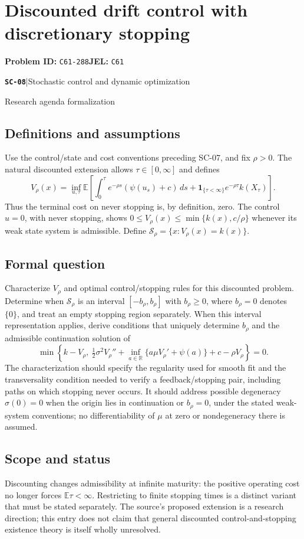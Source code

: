\documentclass[11pt,a4paper]{article}
\newcommand{\R}{\mathbb R}
\newcommand{\E}{\mathbb E}
\newcommand{\ind}{\mathbf 1}
\newcommand{\entrymeta}[3]{{\sffamily\small\color{muted}\textbf{\texttt{#1}}\quad|\quad #2\par #3\par}}
\begin{document}
\section*{Discounted drift control with discretionary stopping}
\textbf{Problem ID:} \texttt{C61-288}\quad \textbf{JEL:} \texttt{C61}\par
\label{problem:OP-0569}
\label{beyond:SC-08}
\entrymeta{SC-08}{Stochastic control and dynamic optimization}{Research agenda formalization}
\subsection*{Definitions and assumptions}
Use the control/state and cost conventions preceding SC-07, and fix
$\rho>0$. The natural discounted extension allows $\tau\in[0,\infty]$
and defines
\[
 V_\rho(x)=\inf_{u,\tau}
 \E\left[\int_0^\tau e^{-\rho s}(\psi(u_s)+c)\,ds
 +\ind_{\{\tau<\infty\}}e^{-\rho\tau}k(X_\tau)\right].
\]
Thus the terminal cost on never stopping is, by definition, zero.
The control $u=0$, with never stopping, shows
$0\leq V_\rho(x)\leq\min\{k(x),c/\rho\}$ whenever its weak state
system is admissible. Define $\mathcal S_\rho=\{x:V_\rho(x)=k(x)\}$.
\subsection*{Formal question}
Characterize $V_\rho$ and optimal control/stopping rules for this
discounted problem. Determine when $\mathcal S_\rho$ is an interval
$[-b_\rho,b_\rho]$ with $b_\rho\geq0$, where $b_\rho=0$ denotes
$\{0\}$, and treat an empty stopping region separately. When this
interval representation applies, derive conditions that uniquely determine
$b_\rho$ and the admissible continuation solution of
\[
 \min\left\{k-V_\rho,\ \tfrac12\sigma^2V_\rho''+
 \inf_{a\in\R}\{a\mu V_\rho'+\psi(a)\}+c-\rho V_\rho\right\}=0.
\]
The characterization should specify the regularity used for smooth fit
and the transversality condition needed to verify a feedback/stopping
pair, including paths on which stopping never occurs.
It should address possible degeneracy $\sigma(0)=0$ when the origin lies
in continuation or $b_\rho=0$, under the stated weak-system conventions;
no differentiability of $\mu$ at zero or nondegeneracy there is assumed.
\subsection*{Scope and status}
Discounting changes admissibility at infinite maturity: the positive
operating cost no longer forces $\E\tau<\infty$. Restricting to finite
stopping times is a distinct variant that must be stated separately.
The source's proposed extension is a research direction; this entry
does not claim that general discounted control-and-stopping existence
theory is itself wholly unresolved.
\end{document}
